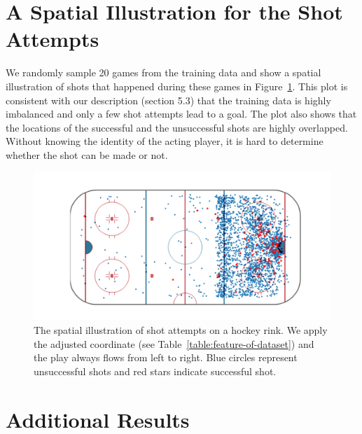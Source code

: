 \documentclass{article}
\begin{document}
\section{A Spatial Illustration for the Shot Attempts}
We randomly sample 20 games from the training data and show a spatial illustration of shots that happened during these games in Figure~\ref{fig:shots-spatial}. This plot is consistent with our description (section 5.3) that the training data is highly imbalanced and only a few shot attempts lead to a goal. The plot also shows that the locations of the successful and the unsuccessful shots are highly overlapped. Without knowing the identity of the acting player, it is hard to determine whether the shot can be made or not.
\begin{figure}[!htbp]
    \centering
    \includegraphics[width=0.8\columnwidth]{figures/shot_scatter_plot_blend.png}
    \caption{The spatial illustration of shot attempts on a hockey rink. We apply the adjusted coordinate (see Table~\ref{table:feature-of-dataset}) and the play always flows from left to right. Blue circles represent unsuccessful shots and red stars indicate successful shot.  }
    \label{fig:shots-spatial}
\end{figure}

\section{Additional Results}
\end{document}
